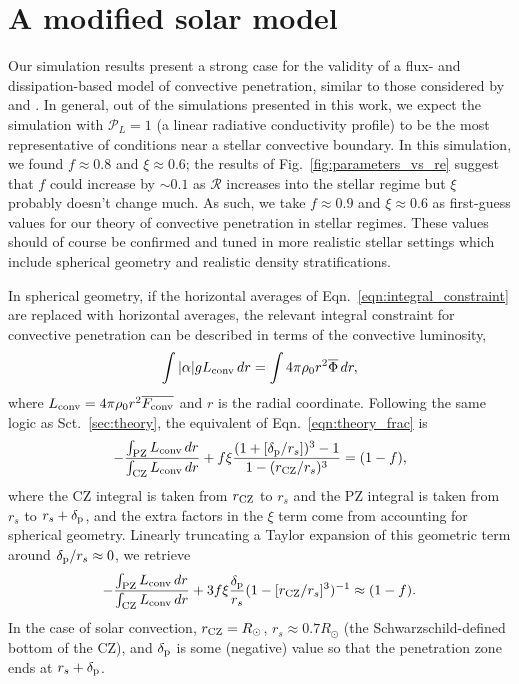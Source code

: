 \documentclass{aastex631}
\newcommand{\delp}{\ensuremath{\delta_{\rm{p}}}}
\newcommand{\mP}{\ensuremath{\mathcal{P}}}
\newcommand{\mR}{\ensuremath{\mathcal{R}}}
\renewcommand{\bar}[1]{\overline{#1}}
\begin{document}
\section{A modified solar model}
\label{sec:solar_model}
Our simulation results present a strong case for the validity of a flux- and dissipation-based model of convective penetration, similar to those considered by \citet{zahn1991} and \citet{roxburgh1989}.
In general, out of the simulations presented in this work, we expect the simulation with $\mP_L = 1$ (a linear radiative conductivity profile) to be the most representative of conditions near a stellar convective boundary.
In this simulation, we found $f \approx 0.8$ and $\xi \approx 0.6$; the results of Fig.~\ref{fig:parameters_vs_re} suggest that $f$ could increase by $\sim 0.1$ as $\mR$ increases into the stellar regime but $\xi$ probably doesn't change much.
As such, we take $f \approx 0.9$ and $\xi \approx 0.6$ as first-guess values for our theory of convective penetration in stellar regimes.
These values should of course be confirmed and tuned in more realistic stellar settings which include spherical geometry and realistic density stratifications.

In spherical geometry, if the horizontal averages of Eqn.~\ref{eqn:integral_constraint} are replaced with horizontal averages, the relevant integral constraint for convective penetration can be described in terms of the convective luminosity,
\begin{equation}
\int |\alpha| g L_{\rm{conv}}\,dr =   \int 4\pi \rho_0 r^2\bar{\Phi}\,dr,
\end{equation}
where $L_{\rm{conv}} = 4\pi\rho_0 r^2 \bar{F_{\rm{conv}}}$ and $r$ is the radial coordinate.
Following the same logic as Sct.~\ref{sec:theory}, the equivalent of Eqn.~\ref{eqn:theory_frac} is
\begin{equation}
-\frac{\int_{\rm{PZ}} L_{\rm{conv}}\,dr}{\int_{\rm{CZ}} L_{\rm{conv}}\,dr} + f \xi \frac{(1 + [\delp/r_s])^3 - 1}{1 - (r_{\rm{CZ}}/r_s)^3} = (1 - f),
\end{equation}
where the CZ integral is taken from $r_{\rm{CZ}}$ to $r_s$ and the PZ integral is taken from $r_s$ to $r_s + \delp$, and the extra factors in the $\xi$ term come from accounting for spherical geometry.
Linearly truncating a Taylor expansion of this geometric term around $\delp/r_s \approx 0$, we retrieve
\begin{equation}
-\frac{\int_{\rm{PZ}} L_{\rm{conv}}\,dr}{\int_{\rm{CZ}} L_{\rm{conv}}\,dr} + 3 f \xi \frac{\delp}{r_s}(1 - [r_{\rm{CZ}}/r_s]^3)^{-1} \approx (1 - f).
\label{eqn:mesa_eqn}
\end{equation}
In the case of solar convection, $r_{\rm{CZ}} = R_{\odot}$, $r_s \approx 0.7R_{\odot}$ (the Schwarzschild-defined bottom of the CZ), and $\delp$ is some (negative) value so that the penetration zone ends at $r_s + \delp$.
\end{document}
